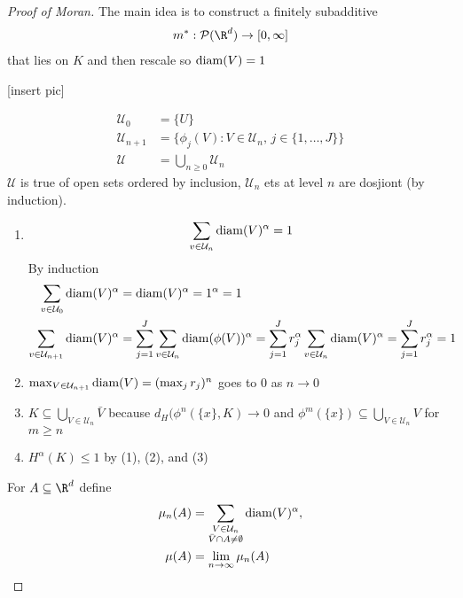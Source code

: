  \begin{proof}[Proof of Moran]
	 The main idea is to construct a finitely subadditive \\
	 \begin{align*}
		 m^{*} : \mathcal{P}(\R^{d}) \to [0, \infty]
	 \end{align*}
	 that lies on $K$ and then rescale so $\operatorname*{diam}(V) = 1$

	 [insert pic]

	 \begin{align*}
		 \mathcal{U}_0 &= \{U \} \\
		 \mathcal{U}_{n+1} &= \{\phi_{j} (V) : V \in \mathcal{U}_{n}, \, j \in \{1, \ldots , J \}\} \\
		 \mathcal{U} &= \bigcup_{n \geq 0} \mathcal{U}_{n}
	 \end{align*} 
$\mathcal{U}$ is true of open sets ordered by inclusion, $\mathcal{U}_{n}$ ets at level $n$ are dosjiont (by induction).

\begin{enumerate}
	\item
		\begin{align*}
			\sum_{v \in \mathcal{U}_n} \operatorname*{diam}(V)^{\alpha} = 1
		\end{align*} By induction 
		\begin{align*}
			\sum_{v \in \mathcal{U}_0} \operatorname*{diam}(V)^{\alpha} &= \operatorname*{diam}(V)^{\alpha} = 1^{\alpha} = 1 \\
			\sum_{v \in \mathcal{U}_{n+1}} \operatorname*{diam}(V)^{\alpha} &=
			\sum_{j=1}^{J} \sum_{v \in \mathcal{U}_n} \operatorname*{diam}(\phi(V))^{\alpha} = 
			\sum_{j=1}^{J} r_{j}^{\alpha} \sum_{v \in \mathcal{U}_n} \operatorname*{diam}(V)^{\alpha} = \sum_{j=1}^{J} r_{j}^{\alpha} = 1
		\end{align*}

	\item $\max_{V \in \mathcal{U}_{n+1}} \operatorname*{diam} (V) = (\max_{j} r_{j})^{n}$ goes to $0$ as $n \to 0$

	\item $K \subseteq \bigcup_{V \in \mathcal{U}_{n}} \bar{V}$ because $d_{H} ( \phi^{n}(\{x\}, K) \to 0$ and $\phi^{m}(\{x\}) \subseteq \bigcup_{V \in \mathcal{U}_{n}} V	$ for $m \geq n$

	\item $H^{\alpha} (K) \leq 1$ by (1), (2), and (3)
\end{enumerate}

For $A \subseteq \R^{d}$ define
\begin{align*}
	\mu_{n}(A) &= \sum_{\substack{V \in \mathcal{U}_n \\ \bar V \cap A \neq \emptyset}} \operatorname*{diam} (V)^{\alpha}, \\
	\mu (A) &= \lim_{n \to \infty} \mu_{n}(A)
\end{align*}


\end{proof}
